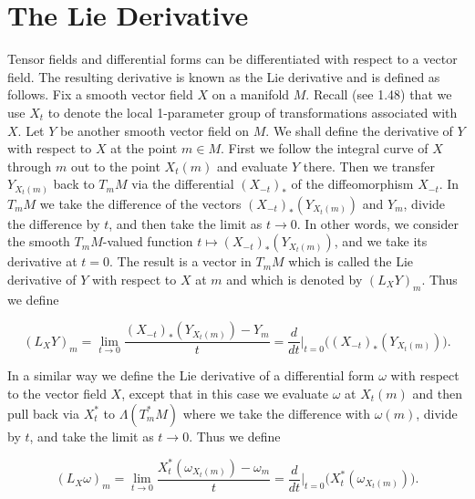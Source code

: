 \section{The Lie Derivative}


\begin{definition}\label{thm:2.24}
Tensor fields and differential forms can be differentiated with respect to a vector field. The resulting derivative is known as the Lie derivative and is defined as follows. Fix a smooth vector field $X$ on a manifold $M$. Recall (see 1.48) that we use $X_t$ to denote the local 1-parameter group of transformations associated with $X$. Let $Y$ be another smooth vector field on $M$. We shall define the derivative of $Y$ with respect to $X$ at the point $m \in M$. First we follow the integral curve of $X$ through $m$ out to the point $X_t(m)$ and evaluate $Y$ there. Then we transfer $Y_{X_{t}(m)}$ back to $T_{m} M$ via the differential $(X_{-t})_{*}$ of the diffeomorphism $X_{-t}$. In $T_{m} M$ we take the difference of the vectors $(X_{-t})_{*}(Y_{X_{t}(m)})$ and $Y_m$, divide the difference by $t$, and then take the limit as $t \to 0$. In other words, we consider the smooth $T_{m} M$-valued function $t \mapsto (X_{-t})_{*}(Y_{X_{t}(m)})$, and we take its derivative at $t = 0$. The result is a vector in $T_{m} M$ which is called the Lie derivative of $Y$ with respect to $X$ at $m$ and which is denoted by $(L_X Y)_m$. Thus we define

\begin{equation}
\tag{1}\label{eq:2.24:1}
(L_{X}Y)_{m}=\lim_{t\to0}\frac{(X_{-t})_{*}(Y_{X_{t}(m)})-Y_{m}}{t}=\frac{d}{d t}\bigg|_{t=0}\big((X_{-t})_{*}(Y_{X_{t}(m)})\big).
\end{equation}

\begin{center}
\end{center}

In a similar way we define the Lie derivative of a differential form $\omega$ with respect to the vector field $X$, except that in this case we evaluate $\omega$ at $X_t(m)$ and then pull back via $X_t^{*}$ to $\Lambda(T_{m}^{*} M)$ where we take the difference with $\omega(m)$, divide by $t$, and take the limit as $t \to 0$. Thus we define 

\begin{equation}
\tag{2}\label{eq:2.24:2}
(L_{X}\omega)_{m}=\lim_{t\to0}\frac{X_{t}^{*}(\omega_{X_{t}(m)})-\omega_{m}}{t}=\frac{d}{d t}\bigg|_{t=0}\big(X_{t}^{*}(\omega_{X_{t}(m)})\big).
\end{equation}


\end{definition}
